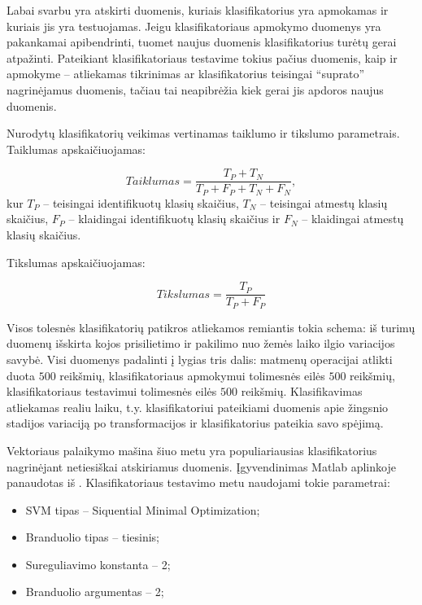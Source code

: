 \documentclass[]{vgtuef}
\begin{document}
Labai svarbu yra atskirti duomenis, kuriais klasifikatorius yra apmokamas ir kuriais jis yra testuojamas. Jeigu klasifikatoriaus apmokymo duomenys yra pakankamai apibendrinti, tuomet naujus duomenis klasifikatorius turėtų gerai atpažinti. Pateikiant klasifikatoriaus testavime tokius pačius duomenis, kaip ir apmokyme -- atliekamas tikrinimas ar klasifikatorius teisingai ``suprato'' nagrinėjamus duomenis, tačiau tai neapibrėžia kiek gerai jis apdoros naujus duomenis.

Nurodytų klasifikatorių veikimas vertinamas taiklumo ir tikslumo parametrais. Taiklumas apskaičiuojamas:

\begin{equation}
Taiklumas = \frac{T_P + T_N}{T_P + F_P + T_N + F_N},
\end{equation}
kur $T_P$ -- teisingai identifikuotų klasių skaičius, $T_N$ -- teisingai atmestų klasių skaičius, $F_P$ -- klaidingai identifikuotų klasių skaičius ir $F_N$ -- klaidingai atmestų klasių skaičius.

Tikslumas apskaičiuojamas:

\begin{equation}
Tikslumas = \frac{T_P}{T_P + F_P}
\end{equation}

Visos tolesnės klasifikatorių patikros atliekamos remiantis tokia schema: iš turimų duomenų išskirta kojos prisilietimo ir pakilimo nuo žemės laiko ilgio variacijos savybė. Visi duomenys padalinti į lygias tris dalis: matmenų operacijai atlikti duota $500$ reikšmių, klasifikatoriaus apmokymui tolimesnės eilės $500$ reikšmių, klasifikatoriaus testavimui tolimesnės eilės $500$ reikšmių. Klasifikavimas atliekamas realiu laiku, t.y. klasifikatoriui pateikiami duomenis apie žingsnio stadijos variaciją po transformacijos ir klasifikatorius pateikia savo spėjimą.

Vektoriaus palaikymo mašina \cite{Burges98atutorial} šiuo metu yra populiariausias klasifikatorius nagrinėjant netiesiškai atskiriamus duomenis. Įgyvendinimas Matlab aplinkoje panaudotas iš \cite{website:svm_implementation}. Klasifikatoriaus testavimo metu naudojami tokie parametrai:

\begin{itemize}
\item SVM tipas -- Siquential Minimal Optimization;
\item Branduolio tipas -- tiesinis;
\item Sureguliavimo konstanta -- 2;
\item Branduolio argumentas -- 2;
\end{itemize}
\end{document}
